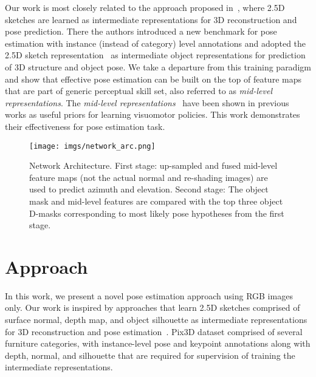 \documentclass[letterpaper, 10 pt, conference]{ieeeconf}  \pdfoutput=1
\begin{document}
Our work is most closely related to the approach proposed in~\cite{pix3d}, where 2.5D sketches are learned as intermediate representations for 3D reconstruction and pose prediction. There the authors introduced a new benchmark for pose estimation with instance (instead of category) level annotations and adopted the 2.5D sketch representation~\cite{marrnet} as intermediate object representations for prediction of 3D structure and object pose. 
We take a departure from this training paradigm and show that effective pose estimation can be built on the top of feature maps that are part of generic perceptual skill set, also referred to as {\em mid-level representations}. The {\em mid-level representations}~\cite{midLevelReps2018} have been shown in previous works as useful priors for learning visuomotor policies. This work demonstrates their effectiveness for pose estimation task. 
\begin{figure*}[htbp]
\begin{center}
\texttt{[image: imgs/network\_arc.png]}
\end{center}
   \caption{Network Architecture. First stage: up-sampled and fused mid-level feature maps (not the actual normal and re-shading images) are used to predict azimuth and elevation. Second stage: The object mask and mid-level features are compared with the top three object D-masks corresponding to most likely pose hypotheses from the first stage.}
\label{Network}
\end{figure*}
\section{Approach}
In this work, we present a novel pose estimation approach using RGB images only. Our work is inspired by approaches that learn 2.5D sketches comprised of surface normal, depth map, and object silhouette as intermediate representations for 3D reconstruction and pose estimation~\cite{marrnet, pix3d}. Pix3D dataset comprised of several furniture categories, with instance-level pose and keypoint annotations along with depth, normal, and silhouette that are required for supervision of training the intermediate representations. 
\end{document}
